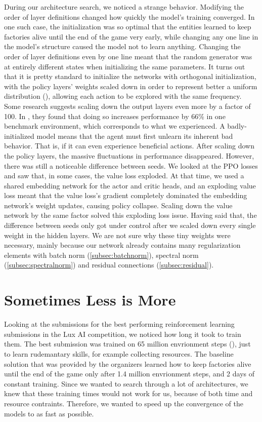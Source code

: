 \noindent During our architecture search, we noticed a strange behavior. Modifying the order of layer definitions changed how quickly the model's training converged. In one such case, the initialization was so optimal that the entities learned to keep factories alive until the end of the game very early, while changing any one line in the model's structure caused the model not to learn anything. Changing the order of layer definitions even by one line meant that the random generator was at entirely different states when initializing the same parameters. It turns out that it is pretty standard to initialize the networks with orthogonal initialization, with the policy layers' weights scaled down in order to represent better a uniform distribution (\cite{shengyi2022the37implementation}), allowing each action to be explored with the same frequency. Some research suggests scaling down the output layers even more by a factor of 100. In \cite{andrychowicz2020matters}, they found that doing so increases performance by 66\% in one benchmark environment, which corresponds to what we experienced. A badly-initialized model means that the agent must first unlearn its inherent bad behavior. That is, if it can even experience beneficial actions. After scaling down the policy layers, the massive fluctuations in performance disappeared. However, there was still a noticeable difference between seeds. We looked at the PPO losses and saw that, in some cases, the value loss exploded. At that time, we used a shared embedding network for the actor and critic heads, and an exploding value loss meant that the value loss's gradient completely dominated the embedding network's weight updates, causing policy collapse. Scaling down the value network by the same factor solved this exploding loss issue. Having said that, the difference between seeds only got under control after we scaled down every single weight in the hidden layers. We are not sure why these tiny weights were necessary, mainly because our network already contains many regularization elements with batch norm (\autoref{subsec:batchnorm}), spectral norm (\autoref{subsec:spectralnorm}) and residual connections (\autoref{subsec:residual}).

\section{Sometimes Less is More}
\label{ch:disc-paying-for-performance}

\noindent Looking at the submissions for the best performing reinforcement learning submissions in the Lux AI competition, we noticed how long it took to train them. The best submission was trained on 65 million envrionment steps (\cite{ferdinand}), just to learn rudemantary skills, for example collecting resources. The baseline solution that was provided by the organizers learned how to keep factories alive until the end of the game only after 1.4 million envrionment steps, and 2 days of constant training. Since we wanted to search through a lot of architectures, we knew that these training times would not work for us, because of both time and resource contraints. Therefore, we wanted to speed up the convergence of the models to as fast as possible.


